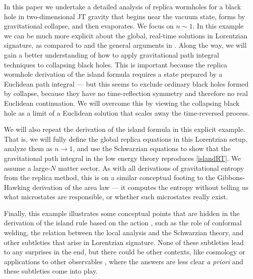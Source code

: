 \documentclass[12pt]{article}
\numberwithin{equation}{section}
\begin{document}
\begin{spacing}{1.1}
In this paper we undertake a detailed analysis of replica wormholes for a black hole in two-dimensional JT gravity that begins near the vacuum state, forms by gravitational collapse, and then evaporates. We focus on $n \sim 1$. In this example we can be much more explicit about the global, real-time solutions in Lorentzian signature, as compared to \cite{Lewkowycz:2013nqa,Dong:2016hjy} and the general arguments in \cite{Almheiri:2019qdq,Penington:2019kki}. Along the way, we will gain a better understanding of how to apply gravitational path integral techniques to collapsing black holes. This is important because the replica wormhole derivation of the island formula requires a state prepared by a Euclidean path integral --- but this seems to exclude ordinary black holes formed by collapse, because they have no time-reflection symmetry and therefore no real Euclidean continuation. We will overcome this by viewing the collapsing black hole as a limit of a Euclidean solution that scales away the time-reversed process.

We will also repeat the derivation of the island formula in this explicit example. That is, we will fully define the global replica equations in this Lorentzian setup, analyze them as $n \to 1$, and use the Schwarzian equations to show that the gravitational path integral in the low energy theory reproduces \eqref{islandRT}. We assume a large-$N$ matter sector. As with all derivations of gravitational entropy from the replica method, this is on a similar conceptual footing to the Gibbons-Hawking derivation of the area law ---  it computes the entropy without telling us what microstates are responsible, or whether such microstates really exist. 

Finally, this example illustrates some conceptual points that are hidden in the derivation of the island rule based on the action \cite{Almheiri:2019qdq, Penington:2019kki}, such as the role of conformal welding, the relation between the local analysis \cite{Lewkowycz:2013nqa} and the Schwarzian theory, and other subtleties that arise in Lorentzian signature. None of these subtleties lead to any surprises in the end, but there could be other contexts, like cosmology \cite{Dong:2020uxp,Krishnan:2020fer,Chen:2020tes,Hartman:2020khs,VanRaamsdonk:2020tlr,Balasubramanian:2020coy} or applications to other observables \cite{Marolf:2020xie,Engelhardt:2020qpv,Stanford:2020wkf,Akers:2020pmf,Marolf:2020rpm,Goel:2020yxl}, where the answers are less clear \textit{a priori} and these subtleties come into play. 





\end{spacing}
\end{document}
